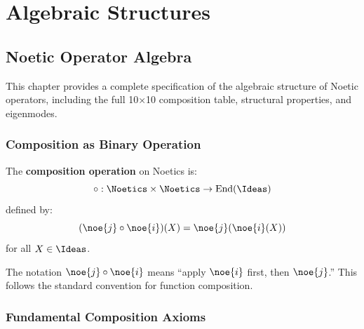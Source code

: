 

\part{Algebraic Structures}

\chapter{Noetic Operator Algebra}
\label{ch:noetic-algebra}

This chapter provides a complete specification of the algebraic structure of Noetic operators, including the full 10×10 composition table, structural properties, and eigenmodes.

\section{Composition as Binary Operation}

\begin{definition}
\label{def:noetic-composition}
The \textbf{composition operation} on Noetics is:
\[
\circ : \Noetics \times \Noetics \to \mathrm{End}(\Ideas)
\]
defined by:
\[
(\noe{j} \circ \noe{i})(X) = \noe{j}(\noe{i}(X))
\]
for all $X \in \Ideas$.
\end{definition}

\begin{remark}
The notation $\noe{j} \circ \noe{i}$ means ``apply $\noe{i}$ first, then $\noe{j}$.'' This follows the standard convention for function composition.
\end{remark}

\section{Fundamental Composition Axioms}

